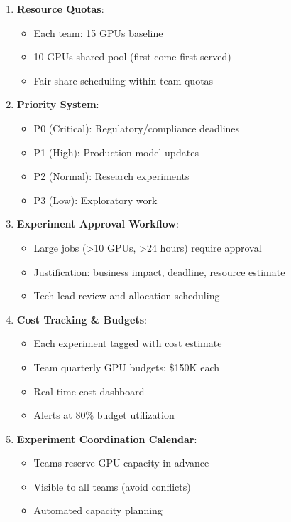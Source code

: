 \begin{enumerate}
    \item \textbf{Resource Quotas}:
    \begin{itemize}
        \item Each team: 15 GPUs baseline
        \item 10 GPUs shared pool (first-come-first-served)
        \item Fair-share scheduling within team quotas
    \end{itemize}

    \item \textbf{Priority System}:
    \begin{itemize}
        \item P0 (Critical): Regulatory/compliance deadlines
        \item P1 (High): Production model updates
        \item P2 (Normal): Research experiments
        \item P3 (Low): Exploratory work
    \end{itemize}

    \item \textbf{Experiment Approval Workflow}:
    \begin{itemize}
        \item Large jobs (>10 GPUs, >24 hours) require approval
        \item Justification: business impact, deadline, resource estimate
        \item Tech lead review and allocation scheduling
    \end{itemize}

    \item \textbf{Cost Tracking \& Budgets}:
    \begin{itemize}
        \item Each experiment tagged with cost estimate
        \item Team quarterly GPU budgets: \$150K each
        \item Real-time cost dashboard
        \item Alerts at 80\% budget utilization
    \end{itemize}

    \item \textbf{Experiment Coordination Calendar}:
    \begin{itemize}
        \item Teams reserve GPU capacity in advance
        \item Visible to all teams (avoid conflicts)
        \item Automated capacity planning
    \end{itemize}


\end{enumerate}
